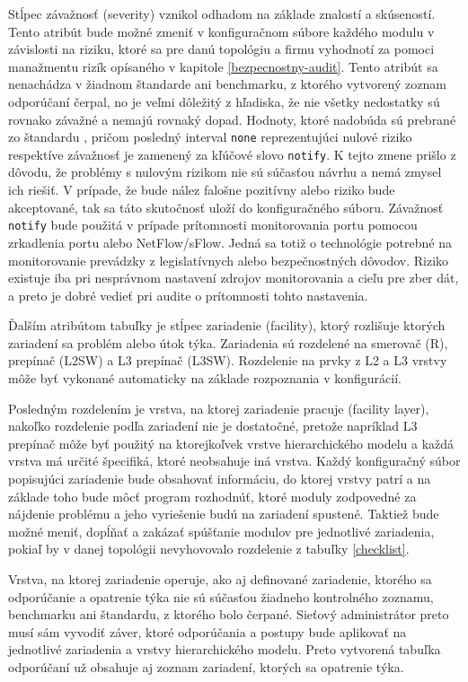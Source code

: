 Stĺpec závažnosť (severity) vznikol odhadom na základe znalostí a skúseností. Tento atribút bude možné zmeniť v konfiguračnom súbore každého modulu v závislosti na riziku, ktoré sa pre danú topológiu a firmu vyhodnotí za pomoci manažmentu rizík opísaného v kapitole \ref{bezpecnostny-audit}. Tento atribút sa nenachádza v žiadnom štandarde ani benchmarku, z ktorého vytvorený zoznam odporúčaní čerpal, no je veľmi dôležitý z hľadiska, že nie všetky nedostatky sú rovnako závažné a nemajú rovnaký dopad. Hodnoty, ktoré nadobúda sú prebrané zo štandardu , pričom posledný interval \texttt{none} reprezentujúci nulové riziko respektíve závažnosť je zamenený za kľúčové slovo \texttt{notify}. K tejto zmene prišlo z dôvodu, že problémy s nulovým rizikom nie sú súčasťou návrhu a nemá zmysel ich riešiť. V prípade, že bude nález falošne pozitívny alebo riziko bude akceptované, tak sa táto skutočnosť uloží do konfiguračného súboru. Závažnosť \texttt{notify} bude použitá v prípade prítomnosti monitorovania portu pomocou zrkadlenia portu alebo NetFlow/sFlow. Jedná sa totiž o technológie potrebné na monitorovanie prevádzky z legislatívnych alebo bezpečnostných dôvodov. Riziko existuje iba pri nesprávnom nastavení zdrojov monitorovania a cieľu pre zber dát, a preto je dobré vedieť pri audite o prítomnosti tohto nastavenia.
 

Ďalším atribútom tabuľky je stĺpec zariadenie (facility), ktorý rozlišuje ktorých zariadení sa problém alebo útok týka. Zariadenia sú rozdelené na smerovač (R), prepínač (L2SW) a L3 prepínač (L3SW). Rozdelenie na prvky z L2 a L3 vrstvy môže byť vykonané automaticky na základe rozpoznania v konfigurácií.

Posledným rozdelením je vrstva, na ktorej zariadenie pracuje (facility layer), nakoľko rozdelenie podľa zariadení nie je dostatočné, pretože napríklad L3 prepínač môže byť použitý na ktorejkoľvek vrstve hierarchického modelu a každá vrstva má určité špecifiká, ktoré neobsahuje iná vrstva. Každý konfiguračný súbor popisujúci zariadenie bude obsahovať informáciu, do ktorej vrstvy patrí a na základe toho bude môcť program rozhodnúť, ktoré moduly zodpovedné za nájdenie problému a jeho vyriešenie budú na zariadení spustené. Taktiež bude možné meniť, dopĺňať a zakázať spúšťanie modulov pre jednotlivé zariadenia, pokiaľ by v danej topológii nevyhovovalo rozdelenie z tabuľky \ref{checklist}. 

Vrstva, na ktorej zariadenie operuje, ako aj definované zariadenie, ktorého sa odporúčanie a opatrenie týka nie sú súčasťou žiadneho kontrolného zoznamu, benchmarku ani štandardu, z ktorého bolo čerpané. Sieťový administrátor preto musí sám vyvodiť záver, ktoré odporúčania a postupy bude aplikovať na jednotlivé zariadenia a vrstvy hierarchického modelu. Preto vytvorená tabuľka odporúčaní už obsahuje aj zoznam zariadení, ktorých sa opatrenie týka.


